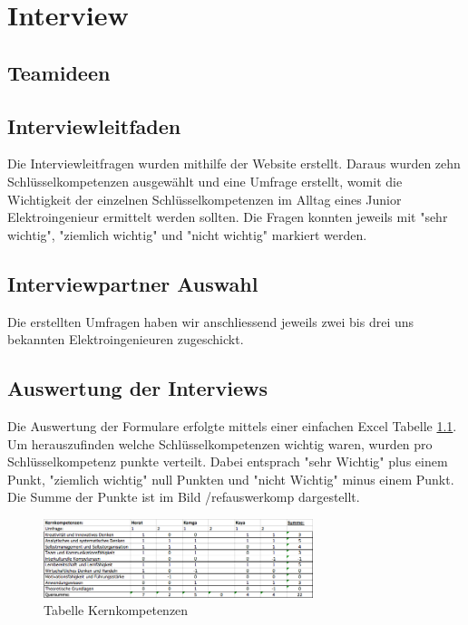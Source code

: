 
\chapter{Interview}

\section{Teamideen}

\section{Interviewleitfaden}

Die Interviewleitfragen wurden mithilfe der Website \cite{Schluesselqualifikationen} erstellt. Daraus wurden zehn Schlüsselkompetenzen ausgewählt und eine Umfrage erstellt, womit die Wichtigkeit der einzelnen Schlüsselkompetenzen im Alltag eines Junior Elektroingenieur ermittelt werden sollten. Die Fragen konnten jeweils mit "sehr wichtig", "ziemlich wichtig" und "nicht wichtig" markiert werden.   


\section{Interviewpartner Auswahl}

Die erstellten Umfragen haben wir anschliessend jeweils zwei bis drei uns bekannten Elektroingenieuren zugeschickt. 

\section{Auswertung der Interviews}

Die Auswertung der Formulare erfolgte mittels einer einfachen Excel Tabelle \ref{tabkernkomp}. Um herauszufinden welche Schlüsselkompetenzen wichtig waren, wurden pro Schlüsselkompetenz punkte verteilt. Dabei entsprach "sehr Wichtig" plus einem Punkt, "ziemlich wichtig" null Punkten und "nicht Wichtig" minus einem Punkt. Die Summe der Punkte ist im Bild /ref{auswerkomp} dargestellt. 

\begin{figure}[ht]
	\centering
	\includegraphics[width=0.7\textwidth]{images/Tabelle_Kernkompetenzen}
	\caption{Tabelle Kernkompetenzen}
	\label{tabkernkomp}
\end{figure}

